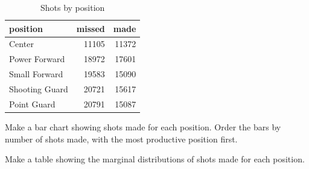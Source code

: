 \documentclass[letterpaper]{exam}
\begin{document}
\begin{questions}
{          \begin{table}[H]
            \centering
            \begin{tabular}{lrr}
              \toprule
              position       & missed & made \\
              \midrule
              Center         & 11105  & 11372 \\
              Power Forward  & 18972  & 17601 \\
              Small Forward  & 19583  & 15090 \\
              Shooting Guard & 20721  & 15617 \\
              Point Guard    & 20791  & 15087 \\
              \bottomrule
            \end{tabular}
            \caption{Shots by position}
            \label{tab:sbp}
          \end{table}
        }

        \question[5] Make a bar chart showing shots made for each position.  Order
          the bars by number of shots made, with the most productive position first.
          \label{q:sbp.first}

        \question[5] Make a table showing the marginal distributions of shots made
        for each position.

        \question 
          \label{q:sbp.last}
        
        \question
          \label{q:draft}


\end{questions}
\end{document}
